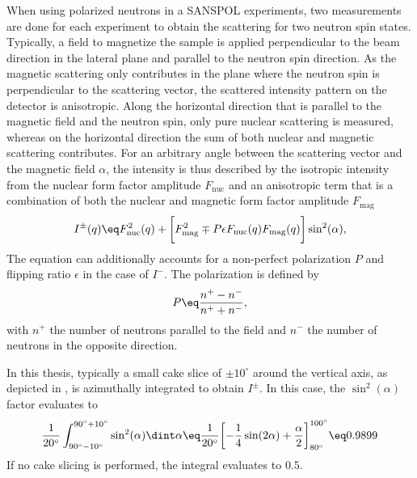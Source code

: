 \documentclass[\main/dresen_thesis.tex]{subfiles}
\begin{document}
    When using polarized neutrons in a SANSPOL experiments, two measurements are done for each experiment to obtain the scattering for two neutron spin states.
    Typically, a field to magnetize the sample is applied perpendicular to the beam direction in the lateral plane and parallel to the neutron spin direction.
    As the magnetic scattering only contributes in the plane where the neutron spin is perpendicular to the scattering vector, the scattered intensity pattern on the detector is anisotropic.
    Along the horizontal direction that is parallel to the magnetic field and the neutron spin, only pure nuclear scattering is measured, whereas on the horizontal direction the sum of both nuclear and magnetic scattering contributes.
    For an arbitrary angle between the scattering vector and the magnetic field $\alpha$, the intensity is thus described by the isotropic intensity from the nuclear form factor amplitude $F_\mathrm{nuc}$ and an anisotropic term that is a combination of both the nuclear and magnetic form factor amplitude $F_\mathrm{mag}$ \cite{Wiedenmann_2001_Small, Kohlbrecher_1997_Magne}
    \begin{align}
      I^\pm(q) \eq F^2_\mathrm{nuc}(q) + \biggl[ F^2_\mathrm{mag} \mp P \epsilon F_\mathrm{nuc}(q) F_\mathrm{mag}(q) \biggr] \sin^2(\alpha),
    \end{align}
    The equation can additionally accounts for a non-perfect polarization $P$ and flipping ratio $\epsilon$ in the case of $I^-$.
    The polarization is defined by
    \begin{align}
      P \eq \frac{n^+ - n^-}{n^+ + n^-},
    \end{align}
    with $n^+$ the number of neutrons parallel to the field and $n^-$ the number of neutrons in the opposite direction.

    In this thesis, typically a small cake slice of $\pm 10^\circ$ around the vertical axis, as depicted in , is azimuthally integrated to obtain $I^\pm$.
    In this case, the $\sin^2(\alpha)$ factor evaluates to
    \begin{align}
      \frac{1}{20^\circ} \int_{90^\circ-10^\circ}^{90^\circ+10^\circ} \sin^2(\alpha) \dint \alpha \eq
        \frac{1}{20^\circ} \biggl[ -\frac{1}{4}\sin(2\alpha)+\frac{\alpha}{2} \biggr]_{80^\circ}^{100^\circ} \eq
        0.9899
    \end{align}
    If no cake slicing is performed, the integral evaluates to $0.5$.
\end{document}

